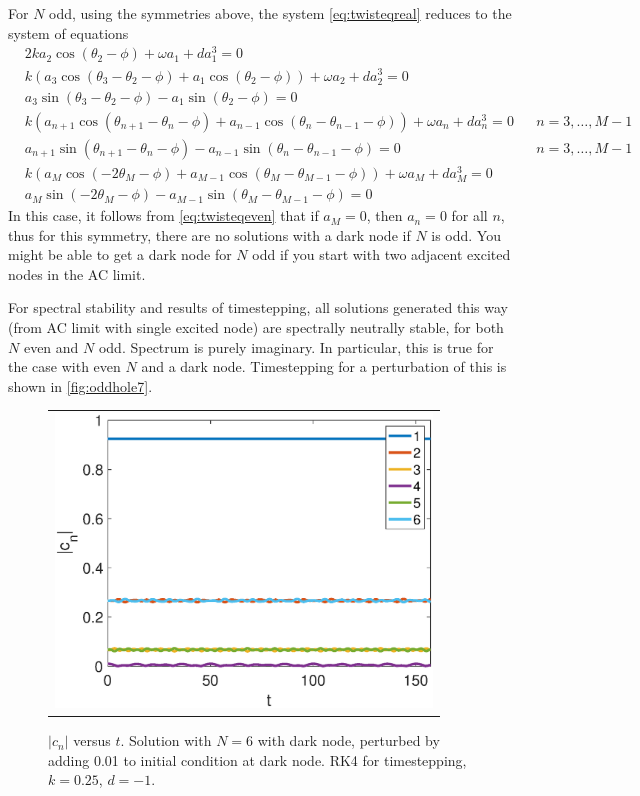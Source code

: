 \documentclass[12pt]{article}
\begin{document}
For $N$ odd, using the symmetries above, the system \cref{eq:twisteqreal} reduces to the system of equations
\begin{equation}\label{eq:twisteqeven}
\begin{aligned}
&2 k a_2 \cos(\theta_2 - \phi) + \omega a_1 + d a_1^3 = 0 \\
&k\left( a_3 \cos(\theta_3-\theta_2-\phi) + a_1 \cos(\theta_2-\phi)\right) + \omega a_2 + d a_2^3 = 0 \\
&a_3 \sin(\theta_3-\theta_2-\phi) - a_1 \sin(\theta_2-\phi) = 0 \\
&k\left( a_{n+1} \cos(\theta_{n+1}-\theta_n-\phi) + a_{n-1} \cos(\theta_n - \theta_{n-1}-\phi)\right) + \omega a_n + d a_n^3 = 0 && n = 3, \dots, M-1 \\
&a_{n+1} \sin(\theta_{n+1}-\theta_n-\phi) - a_{n-1} \sin(\theta_n - \theta_{n-1}-\phi) = 0 && n = 3, \dots, M-1 \\
&k ( a_M \cos(-2 \theta_M - \phi) + a_{M-1} \cos(\theta_M - \theta_{M-1} - \phi)) + \omega a_M + d a_M^3 = 0 \\
& a_M \sin(-2 \theta_M - \phi) - a_{M-1} \sin(\theta_M - \theta_{M-1} - \phi) = 0
\end{aligned}
\end{equation}
In this case, it follows from \cref{eq:twisteqeven} that if $a_M = 0$, then $a_n = 0$ for all $n$, thus for this symmetry, there are no solutions with a dark node if $N$ is odd. You might be able to get a dark node for $N$ odd if you start with two adjacent excited nodes in the AC limit.

For spectral stability and results of timestepping, all solutions generated this way (from AC limit with single excited node) are spectrally neutrally stable, for both $N$ even and $N$ odd. Spectrum is purely imaginary. In particular, this is true for the case with even $N$ and a dark node. Timestepping for a perturbation of this is shown in \cref{fig:oddhole7}.

\begin{figure}[H]
\begin{center}
\begin{tabular}{c}
\includegraphics[width=10cm]{images/evenhole6perturbed.eps}
\end{tabular}
\end{center}
\caption{$|c_n|$ versus $t$. Solution with $N=6$ with dark node, perturbed by adding 0.01 to initial condition at dark node. RK4 for timestepping, $k=0.25$, $d=-1$.}
\label{fig:evenhole6perturbed}
\end{figure}




\end{document}
